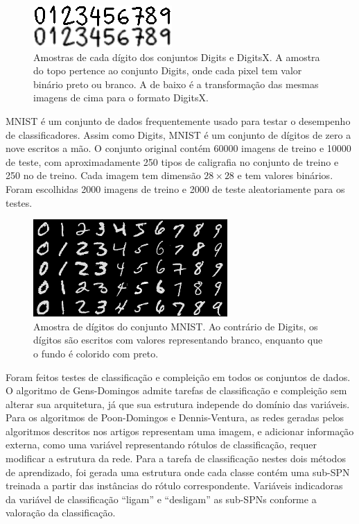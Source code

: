\documentclass[12pt]{article}
\theoremstyle{plain}
\numberwithin{equation}{section}
\begin{document}
\begin{figure}[h]
  \centering\includegraphics[scale=1.5]{imgs/digits_sample.png}
  \captionsetup{justification=raggedright}
  \caption{Amostras de cada dígito dos conjuntos Digits e DigitsX. A amostra do topo pertence ao
    conjunto Digits, onde cada pixel tem valor binário preto ou branco. A de baixo é a
    transformação das mesmas imagens de cima para o formato DigitsX.}
\end{figure}

MNIST é um conjunto de dados frequentemente usado para testar o desempenho de classificadores.
Assim como Digits, MNIST é um conjunto de dígitos de zero a nove escritos a mão. O conjunto
original contém 60000 imagens de treino e 10000 de teste, com aproximadamente 250 tipos de
caligrafia no conjunto de treino e 250 no de treino. Cada imagem tem dimensão $28\times 28$ e tem
valores binários. Foram escolhidas 2000 imagens de treino e 2000 de teste aleatoriamente para os
testes.

\begin{figure}[h]
  \centering\includegraphics[scale=1.0]{imgs/mnist_sample.png}
  \captionsetup{justification=raggedright}
  \caption{Amostra de dígitos do conjunto MNIST\@. Ao contrário de Digits, os dígitos são escritos
    com valores representando branco, enquanto que o fundo é colorido com preto.}
\end{figure}

Foram feitos testes de classificação e compleição em todos os conjuntos de dados. O algoritmo de
Gens-Domingos admite tarefas de classificação e compleição sem alterar sua arquitetura, já que sua
estrutura independe do domínio das variáveis. Para os algoritmos de Poon-Domingos e Dennis-Ventura,
as redes geradas pelos algoritmos descritos nos artigos representam uma imagem, e adicionar
informação externa, como uma variável representando rótulos de classificação, requer modificar a
estrutura da rede. Para a tarefa de classificação nestes dois métodos de aprendizado, foi gerada
uma estrutura onde cada classe contém uma sub-SPN treinada a partir das instâncias do rótulo
correspondente.  Variáveis indicadoras da variável de classificação ``ligam'' e ``desligam'' as
sub-SPNs conforme a valoração da classificação.
\end{document}
